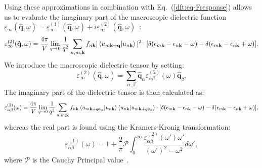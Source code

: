 \begin{refsection}
Using these approximations in combination with Eq.~(\ref{dft:eq-Fresponse}) allows 
us to evaluate the imaginary part of the macroscopic dielectric function 
$\varepsilon_\infty(\mathbf{\hat{q}},\omega) = 
\varepsilon_{\infty}^{(1)}(\mathbf{\hat{q}},\omega) + 
i\varepsilon_{\infty}^{(2)}(\mathbf{\hat{q}},\omega)$~\cite{Harl2008}: 
 \begin{equation}\label{dft:eq-imdiel} 
\varepsilon_{\infty}^{(2)}(\mathbf{\hat{q}},\omega) = \frac{4\pi}{V} \lim_{q 
\rightarrow 0} \frac{1}{q^2} \sum_{n,m,\mathbf{k}} f_{n\mathbf{k}} | 
\braket{u_{m\mathbf{k}+\mathbf{q}}|u_{n\mathbf{k}}} |^2 \cdot 
[\delta(\epsilon_{m\mathbf{k}}-\epsilon_{n\mathbf{k}}-\omega) - 
\delta(\epsilon_{m\mathbf{k}}-\epsilon_{n\mathbf{k}}+\omega)]. 
\end{equation} 
We introduce the macroscopic dielectric tensor by setting: 
\begin{equation} 
\varepsilon_{\infty}^{(2)}(\mathbf{\hat{q}},\omega) = \sum_{\alpha,\beta} 
\mathbf{\hat{q}}_\alpha \varepsilon_{\alpha \beta}^{(2)} (\omega) 
\mathbf{\hat{q}}_\beta. 
\end{equation} 
The imaginary part of the dielectric tensor is then calculated as: 
\begin{equation} \label{dft:eq-imdiel} 
\varepsilon_{\alpha \beta}^{(2)} (\omega) = \frac{4\pi}{V} \lim_{q 
\rightarrow 0} \frac{1}{q^2} \sum_{n,m;\mathbf{k}} f_{n\mathbf{k}} 
\braket{u_{m\mathbf{k}+q\mathbf{e}_\alpha}|u_{n\mathbf{k}}} 
\braket{u_{n\mathbf{k}}|u_{m\mathbf{k}+q\mathbf{e}_\beta}} \cdot 
[\delta(\epsilon_{m\mathbf{k}}-\epsilon_{n\mathbf{k}}-\omega) - 
\delta(\epsilon_{m\mathbf{k}}-\epsilon_{n\mathbf{k}}+\omega)], 
\end{equation} 
whereas the real part is found using the Kramers-Kronig transformation: 
\begin{equation} \label{dft:eq-kramers}
\varepsilon_{\alpha \beta}^{(1)} (\omega) = 1 + \frac{2}{\pi} \mathcal{P} 
\int_0^\infty \frac{\varepsilon_{\alpha \beta}^{(2)} 
(\omega')\omega'}{(\omega')^2 - \omega^2}d\omega', 
\end{equation} 
where $\mathcal{P}$ is the Cauchy Principal value~\cite{Gogolin2014}.  
 

\end{refsection}
